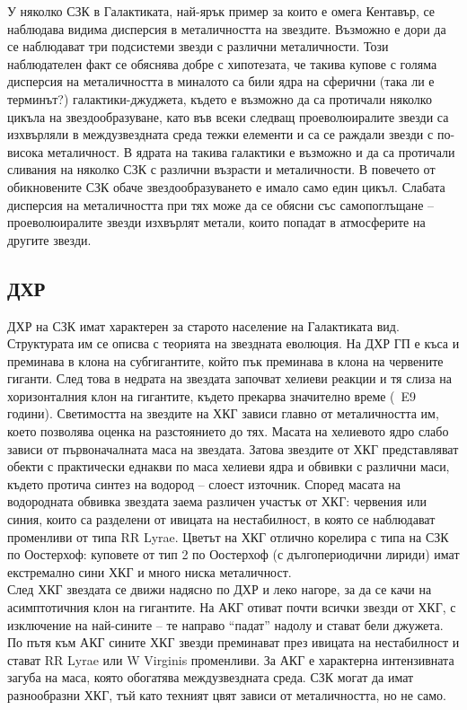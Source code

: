 \documentclass[a4paper,12pt]{article}
\begin{document}
У няколко СЗК в Галактиката, най-ярък пример за които е омега Кентавър, се наблюдава видима дисперсия в металичността на звездите. Възможно е дори да се наблюдават три подсистеми звезди с различни металичности. Този наблюдателен факт се обяснява добре с хипотезата, че такива купове с голяма дисперсия на металичността в миналото са били ядра на сферични (така ли е терминът?) галактики-джуджета, където е възможно да са протичали няколко цикъла на звездообразуване, като във всеки следващ проеволюиралите звезди са изхвърляли в междузвездната среда тежки елементи и са се раждали звезди с по-
висока металичност. В ядрата на такива галактики е възможно и да са протичали сливания на няколко СЗК с различни възрасти и металичности. В повечето от обикновените СЗК обаче звездообразуването е имало само един цикъл. Слабата дисперсия на металичността при тях може да се обясни със самопоглъщане – проеволюиралите звезди изхвърлят метали, които попадат в атмосферите на другите звезди.

\subsection{ДХР}
ДХР на СЗК имат характерен за старото население на Галактиката вид. Структурата им се описва с теорията на звездната еволюция. На ДХР ГП е къса и преминава в клона на субгигантите, който пък преминава в клона на червените гиганти. След това в недрата на звездата започват хелиеви реакции и тя слиза на хоризонталния клон на гигантите, където прекарва значително време (~E9 години). Светимостта на звездите на ХКГ зависи главно от металичността им, което позволява оценка
на разстоянието до тях. Масата на хелиевото ядро слабо зависи от първоначалната маса на звездата. Затова звездите от ХКГ представляват обекти с практически еднакви по маса хелиеви ядра и обвивки с различни маси, където протича синтез на водород – слоест източник. Според масата на водородната обвивка звездата заема различен участък от ХКГ: червения или синия, които са разделени от ивицата на нестабилност, в която се наблюдават променливи от типа RR Lyrae. Цветът на ХКГ отлично корелира с типа на СЗК по Оостерхоф: куповете от тип 2 по Оостерхоф (с дългопериодични лириди) имат екстремално сини ХКГ и много ниска металичност.\\

След ХКГ звездата се движи надясно по ДХР и леко нагоре, за да се качи на асимптотичния клон на гигантите. На АКГ отиват почти всички звезди от ХКГ, с изключение на най-сините – те направо “падат” надолу и стават бели джужета. По пътя към АКГ сините ХКГ звезди преминават през ивицата на нестабилност и стават RR Lyrae или W Virginis променливи. За АКГ е характерна интензивната загуба на маса, която обогатява междузвездната среда. СЗК могат да имат разнообразни ХКГ, тъй като техният цвят зависи от металичността, но не само.\\
\end{document}
